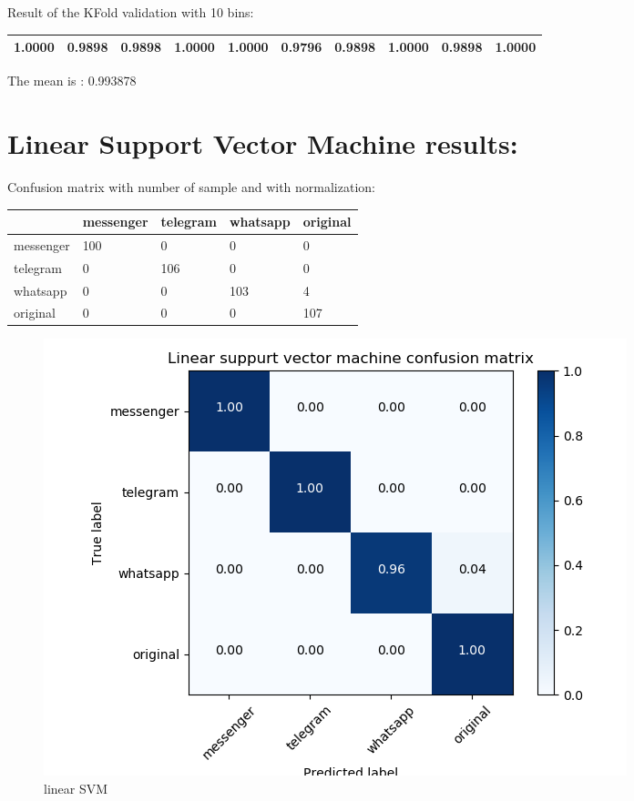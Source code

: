 Result of the KFold validation with 10 bins:
 {\def\arraystretch{1.3} 
 \begin{table}[H] 
\centering 
\begin{tabular}{|l |l |l |l |l |l |l |l |l |l |}  
\hline 
1.0000&
0.9898&
0.9898&
1.0000&
1.0000&
0.9796&
0.9898&
1.0000&
0.9898&
1.0000\\ \hline  

\end{tabular} 
\end{table} }

The mean is : 0.993878\section{Linear Support Vector Machine results:}Confusion matrix with number of sample and with normalization:
 {\def\arraystretch{1.3} 
 \begin{table}[H] 
\centering 
\begin{tabular}{|l|l|l|l|l|} 
\hline 
  &messenger  &telegram  &whatsapp  &original  \\ \hline
messenger  &100  &0  &0  &0  \\ \hline
telegram  &0  &106  &0  &0  \\ \hline
whatsapp  &0  &0  &103  &4  \\ \hline
original  &0  &0  &0  &107  \\ \hline
\end{tabular} 
\end{table} }

 \begin{figure}[H] 
\centering 
\includegraphics[scale=.6]{images/lsvm_initial.png} 
\caption{linear SVM} 
\end{figure} 


